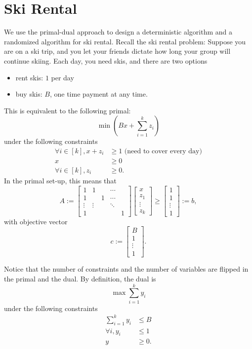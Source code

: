 \documentclass[11pt]{article}
\begin{document}
\section{Ski Rental} 
We use the primal-dual approach to design a deterministic algorithm and a randomized algorithm for ski rental. Recall the ski rental problem: Suppose you are on a ski trip, and you let your friends dictate how long your group will continue skiing. Each day, you need skis, and there are two options
\begin{itemize}
\item{rent skis: $1$ per day}
\item{buy skis: $B$, one time payment at any time.}
\end{itemize}
This is equivalent to the following primal:
\[\min (Bx + \sum_{i=1}^k z_i)\] under the following constraints
\begin{align*}
\forall i \in [k], x+ z_i &\ge 1 \text{ (need to cover every day)} \\
x &\ge 0 \\
\forall i \in [k], z_i &\ge 0.
\end{align*}
In the primal set-up, this means that 
\[ 
  A:= \left[\begin{array}{c|cccc}
    1 & 1 &   & \cdots  \\
    1 &   & 1 & \cdots  \\
    \vdots & \vdots & & \ddots \\
    1 & & & & 1
  \end{array}\right]
  \left[\begin{array}{c}
    x \\
    z_1 \\
    \vdots \\
    z_k
  \end{array}\right]
  \ge
  \left[\begin{array}{c}
    1 \\
    1 \\
    \vdots \\
    1
  \end{array} \right] := b,
\]
with objective vector
\[
  c := \left[\begin{array}{c}
    B \\
    1 \\
    \vdots \\
    1
  \end{array} \right].
\]

Notice that the number of constraints  and the number of variables are flipped in the primal and the dual. By definition, the dual is 
\[\max \sum_{i=1}^k y_i\] under the following constraints
\begin{align*}
\sum_{i=1}^k y_i &\le B \\
\forall i, y_i &\le 1 \\
y &\ge 0.
\end{align*}
\end{document}
